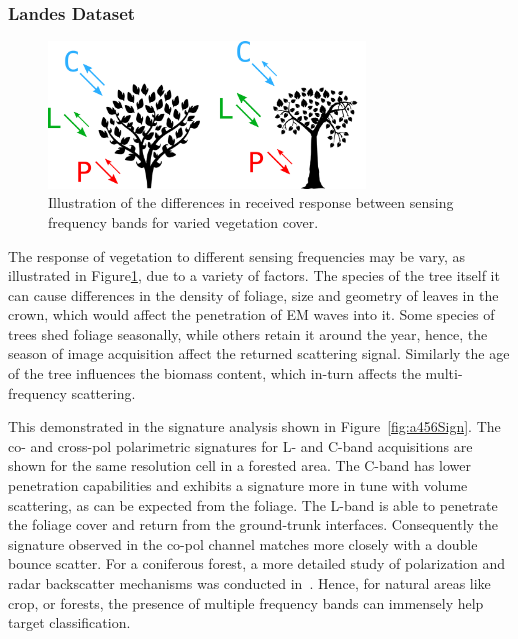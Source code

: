
\subsubsection{Landes Dataset}

\begin{figure}[tbp]
\centering
\includegraphics[width=0.75\textwidth]{Figures/Extra/Multifreq_tree}
\caption{Illustration of the differences in received response between sensing frequency bands for varied vegetation cover.  }
\label{fig:tree_multifreq}
\end{figure}

The response of vegetation to different sensing frequencies may be vary, as illustrated in Figure\ref{fig:tree_multifreq}, due to a variety of factors. The species of the tree itself it can cause differences in the density of foliage, size and geometry of leaves in the crown, which would affect the penetration of EM waves into it. Some species of trees shed foliage seasonally, while others retain it around the year, hence, the season of image acquisition affect the returned scattering signal. Similarly the age of the tree influences the biomass content, which in-turn affects the multi-frequency scattering.

This demonstrated in the signature analysis shown in Figure~\ref{fig:a456Sign}. The  co- and cross-pol polarimetric signatures for L- and C-band acquisitions are shown for the same resolution cell in a forested area. The C-band has lower penetration capabilities and exhibits a signature more in tune with volume scattering, as can be expected from the foliage. The L-band is able to penetrate the foliage cover and return from the ground-trunk interfaces. Consequently the signature observed in the co-pol channel matches more closely with a double bounce scatter. For a coniferous forest, a more detailed study of polarization and radar backscatter mechanisms was conducted in~\cite{134090}. Hence, for natural areas like crop, or forests, the presence of multiple frequency bands can immensely help target classification.

